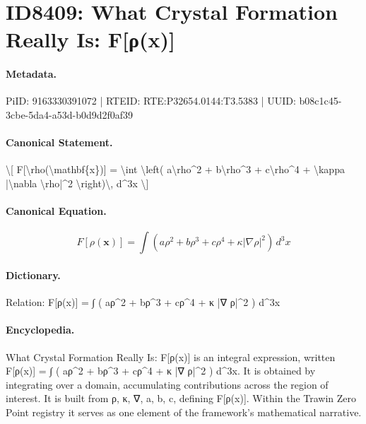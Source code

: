 \section*{ID8409: What Crystal Formation Really Is: F[ρ(x)]}
\paragraph{Metadata.}
PiID: 9163330391072 | RTEID: RTE:P32654.0144:T3.5383 | UUID: b08c1c45-3cbe-5da4-a53d-b0d9d2f0af39

\paragraph{Canonical Statement.}
\textbackslash{}[ F[\textbackslash{}rho(\textbackslash{}mathbf\{x\})] = \textbackslash{}int \textbackslash{}left( a\textbackslash{}rho\textasciicircum{}2 + b\textbackslash{}rho\textasciicircum{}3 + c\textbackslash{}rho\textasciicircum{}4 + \textbackslash{}kappa |\textbackslash{}nabla \textbackslash{}rho|\textasciicircum{}2 \textbackslash{}right)\textbackslash{}, d\textasciicircum{}3x \textbackslash{}]

\paragraph{Canonical Equation.}
\[
F[\rho(\mathbf{x})] = \int \left( a\rho^2 + b\rho^3 + c\rho^4 + \kappa |\nabla \rho|^2 \right)\, d^3x
\]

\paragraph{Dictionary.}
Relation: F[ρ(x)] = ∫ ( aρ\textasciicircum{}2 + bρ\textasciicircum{}3 + cρ\textasciicircum{}4 + κ |∇ ρ|\textasciicircum{}2 ) d\textasciicircum{}3x

\paragraph{Encyclopedia.}
What Crystal Formation Really Is: F[ρ(x)] is an integral expression, written F[ρ(x)] = ∫ ( aρ\textasciicircum{}2 + bρ\textasciicircum{}3 + cρ\textasciicircum{}4 + κ |∇ ρ|\textasciicircum{}2 ) d\textasciicircum{}3x. It is obtained by integrating over a domain, accumulating contributions across the region of interest. It is built from ρ, κ, ∇, a, b, c, defining F[ρ(x)]. Within the Trawin Zero Point registry it serves as one element of the framework's mathematical narrative.
